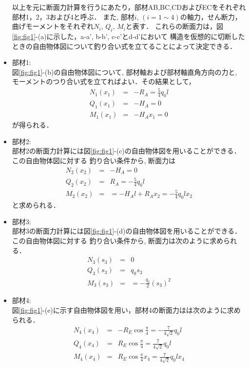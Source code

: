 \documentclass[10pt,a4j]{jarticle}
\begin{document}
\begin{itemize}
	以上を元に断面力計算を行うにあたり，部材AB,BC,CDおよびECをそれぞれ部材1，2，3および4と呼ぶ．
	また, 部材$i,\,(i=1\sim 4)$の軸力，せん断力，曲げモーメントをそれぞれ$N_i, \, Q_i,\, M_i$と表す．
	これらの断面力は，図\ref{fig:fig1}-(a)に示した，a-a', b-b', c-c'とd-d'において
	構造を仮想的に切断したときの自由物体図について釣り合い式を立てることによって決定できる．
\item
	{\rm 部材1:} \\
	図\ref{fig:fig1}-(b)の自由物体図について, 部材軸および部材軸直角方向の力と, 
	モーメントのつり合い式を立てればよい．その結果として，
	\begin{eqnarray}
		N_1(x_1) & =& -R_A=\frac{5}{4}q_0l \\
		Q_1(x_1) & =& -H_A=0\\
		M_1(x_1) & =& -H_Ax_1=0
	\end{eqnarray}
	が得られる．
\item
	{\rm 部材2:} \\
	部材2の断面力計算には図\ref{fig:fig1}-(c)の自由物体図を用いることができる．この自由物体図に対する
	釣り合い条件から, 断面力は
	\begin{eqnarray}
		N_2(x_2) 
			&=& 
			-H_A=0\\
		Q_2(x_2) 
			&=&
			R_A= -\frac{5}{4}q_0l \\
		M_2(x_2) 
			&=&
			=-H_Al+R_Ax_2
			=-\frac{5}{4}q_0lx_2
	\end{eqnarray}
	と求められる．
\item
	{\rm 部材3:} \\
	部材3の断面力計算には図\ref{fig:fig1}-(d)の自由物体図を用いることができる．この自由物体図に対する
	釣り合い条件から, 断面力は次のように求められる．
	\begin{eqnarray}
		N_3(s_3) 
			&=&  0 \\
		Q_3(s_3) 
			&=&
			q_0s_3 \\
		M_3(s_3) 
			&=&
			=-\frac{q_0}{2}(s_3)^2
	\end{eqnarray}
\item
	{\rm 部材4:} \\
	図\ref{fig:fig1}-(e)に示す自由物体図を用い，部材4の断面力はは次のように求められる．
	\begin{eqnarray}
		N_4(x_4) 
			&=&  -R_E\cos\frac{\pi}{4}=-\frac{7}{4\sqrt{2}}q_0l \\
		Q_4(x_4) 
			&=&  R_E\cos\frac{\pi}{4}=\frac{7}{4\sqrt{2}}q_0l \\
		M_4(x_4) 
			&=&  R_E\cos\frac{\pi}{4}x_4 =\frac{7}{4\sqrt{2}}q_0lx_4 
	\end{eqnarray}
\end{itemize}
\end{document}
